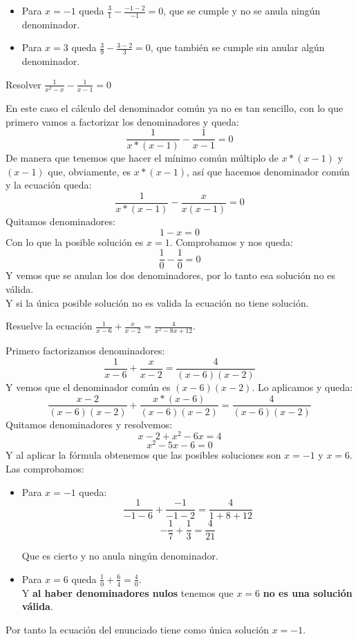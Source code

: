 \documentclass[a4paper,11pt,answers]{exam}
\begin{document}
\begin{questions}
\begin{solution}
\begin{itemize}
    \item Para $x = -1$ queda $\frac{3}{1} - \frac{-1-2}{-1} = 0$, que se cumple y no se anula ningún
      denominador.
    \item Para $x = 3$ queda $\frac{3}{9} - \frac{3 - 2}{3} = 0$, que también se cumple sin anular algún
      denominador.
    \end{itemize}
  \end{solution}
\question Resolver $\frac{1}{x^2 - x} - \frac{1}{x-1} = 0$
  \begin{solution}
    En este caso el cálculo del denominador común ya no es tan sencillo, con lo que primero vamos
    a factorizar los denominadores y queda:
    \[\frac{1}{x*(x-1)} - \frac{1}{x-1} = 0\]
    De manera que tenemos que hacer el mínimo común múltiplo de $x*(x-1)$ y $(x-1)$ que, obviamente,
    es $x*(x-1)$, así que hacemos denominador común y la ecuación queda:
    \[\frac{1}{x*(x-1)} - \frac{x}{x(x-1)} = 0\]
    Quitamos denominadores:
    \[1 - x = 0\]
    Con lo que la posible solución es $x = 1$. Comprobamos y nos queda:
    \[\frac{1}{0} - \frac{1}{0} = 0\]
    Y vemos que se anulan los dos denominadores, por lo tanto esa solución no es válida.\\
    Y si la única posible solución no es valida la ecuación no tiene solución.
  \end{solution}
\question Resuelve la ecuación $\frac{1}{x-6} + \frac{x}{x-2} = \frac{4}{x^2 - 8x + 12}$.
  \begin{solution}
    Primero factorizamos denominadores:
    \[\frac{1}{x-6} + \frac{x}{x-2} = \frac{4}{(x-6)(x-2)}\]
    Y vemos que el denominador común es $(x-6)(x-2)$. Lo aplicamos y queda:
    \[\frac{x-2}{(x-6)(x-2)} + \frac{x*(x-6)}{(x-6)(x-2)} = \frac{4}{(x-6)(x-2)}\]
    Quitamos denominadores y resolvemos:
    \[x-2 + x^2 - 6x = 4\]
    \[x^2 - 5x - 6 = 0\]
    Y al aplicar la fórmula obtenemos que las posibles soluciones son $x = -1$ y $x = 6$. Las
    comprobamos:
    \begin{itemize}
    \item Para $x = -1$ queda:
      \[\frac{1}{-1-6} + \frac{-1}{-1-2} = \frac{4}{1 +8 + 12}\]
      \[-\frac{1}{7} + \frac{1}{3} = \frac{4}{21}\]
      
      Que es cierto y no anula ningún denominador.
    \item Para $x = 6$ queda $\frac{1}{0} + \frac{6}{4} = \frac{4}{0}$.\\
      
      Y \textbf{al haber denominadores nulos} tenemos que $x = 6$ \textbf{no es una solución
        válida}.
    \end{itemize}
    Por tanto la ecuación del enunciado tiene como única solución $x = -1$.
  \end{solution}
\end{questions}
\end{document}

